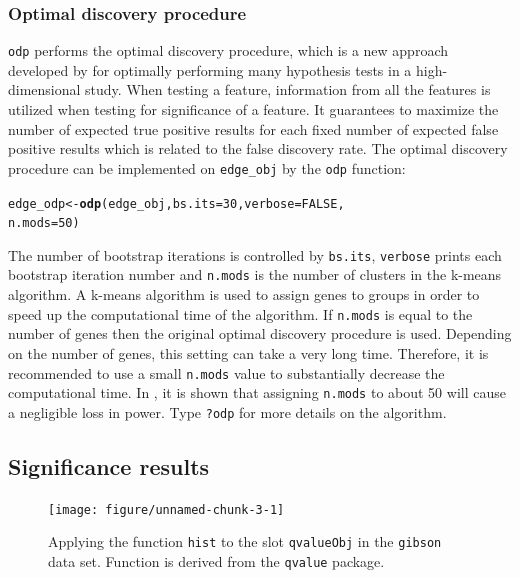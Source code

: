 \documentclass{article}\usepackage[]{graphicx}\usepackage[]{color}
\makeatletter
\newcommand{\hlnum}[1]{\textcolor[rgb]{0.686,0.059,0.569}{#1}}%
\newcommand{\hlstd}[1]{\textcolor[rgb]{0.345,0.345,0.345}{#1}}%
\newcommand{\hlkwb}[1]{\textcolor[rgb]{0.69,0.353,0.396}{#1}}%
\newcommand{\hlkwc}[1]{\textcolor[rgb]{0.333,0.667,0.333}{#1}}%
\newcommand{\hlkwd}[1]{\textcolor[rgb]{0.737,0.353,0.396}{\textbf{#1}}}%
\newenvironment{kframe}{%
 \def\at@end@of@kframe{}%
 \ifinner\ifhmode%
  \def\at@end@of@kframe{\end{minipage}}%
  \begin{minipage}{\columnwidth}%
 \fi\fi%
 \def\FrameCommand##1{\hskip\@totalleftmargin \hskip-\fboxsep
 \colorbox{shadecolor}{##1}\hskip-\fboxsep
     \hskip-\linewidth \hskip-\@totalleftmargin \hskip\columnwidth}%
 \MakeFramed {\advance\hsize-\width
   \@totalleftmargin\z@ \linewidth\hsize
   \@setminipage}}%
 {\par\unskip\endMakeFramed%
 \at@end@of@kframe}
\newenvironment{knitrout}{}{} %
\makeatother
\begin{document}
\subsubsection{Optimal discovery procedure}
{\tt odp} performs the optimal discovery procedure, which is a new approach developed by \cite{storey:2005} for optimally performing many hypothesis tests in a high-dimensional study. When testing a feature, information from all the features is utilized when testing for significance of a feature. It guarantees to maximize the number of expected true positive results for each fixed number of expected false positive results which is related to the false discovery rate. The optimal discovery procedure can be implemented on {\tt edge\_obj} by the {\tt odp} function:
\begin{knitrout}
\color{fgcolor}\begin{kframe}
\begin{alltt}
\hlstd{edge_odp} \hlkwb{<-} \hlkwd{odp}\hlstd{(edge_obj,} \hlkwc{bs.its} \hlstd{=} \hlnum{30}\hlstd{,} \hlkwc{verbose} \hlstd{=} \hlnum{FALSE}\hlstd{,}
    \hlkwc{n.mods} \hlstd{=} \hlnum{50}\hlstd{)}
\end{alltt}
\end{kframe}
\end{knitrout}
The number of bootstrap iterations is controlled by {\tt bs.its}, {\tt verbose} prints each bootstrap iteration number and {\tt n.mods} is the number of clusters in the k-means algorithm. A k-means algorithm is used to assign genes to groups in order to speed up the computational time of the algorithm. If {\tt n.mods} is equal to the number of genes then the original optimal discovery procedure is used. Depending on the number of genes, this setting can take a very long time.  Therefore, it is recommended to use a small {\tt n.mods} value to substantially decrease the computational time. In \cite{woo:leek:storey:2011}, it is shown that assigning {\tt n.mods} to about 50 will cause a negligible loss in power. Type {\tt ?odp} for more details on the algorithm.

\subsection{Significance results}
\begin{figure}[t]
 \centering
\begin{knitrout}
\color{fgcolor}

{\centering \texttt{[image: figure/unnamed-chunk-3-1]} 

}



\end{knitrout}
\caption{Applying the function {\tt hist} to the slot {\tt qvalueObj} in the {\tt gibson} data set. Function is derived from the {\tt qvalue} package.}
\label{fig:gqvalHist}
\end{figure}
\end{document}
